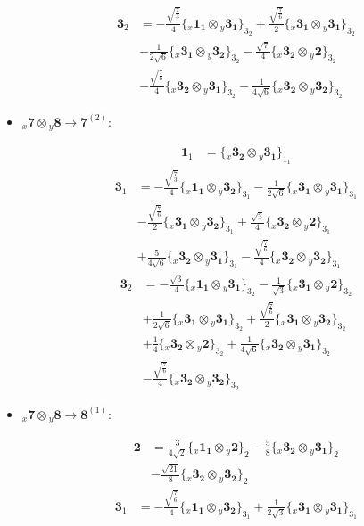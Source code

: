 \documentclass[english]{article}
\newcommand{\rep}[1]{\mathbf{#1}}
\newcommand{\repx}[2]{{}_{#2}\mathbf{#1}}
\newcommand{\tsprodx}[2]{\repx{#1}{x}\otimes\repx{#2}{y}}
\newcommand{\subcgs}[3]{\big\{ \tsprodx{#1}{#2}\big\}^{}_{#3}}
\begin{document}
\begin{itemize}
\begin{fleqn}
\begin{align*}
\rep{3}_{2} & = -\frac{\sqrt{\frac{7}{3}}}{4}\subcgs{1_{1}}{3_{1}}{3_{2}}+\frac{\sqrt{\frac{7}{6}}}{2}\subcgs{3_{1}}{3_{1}}{3_{2}} \\ 
 & -\frac{1}{2 \sqrt{6}}\subcgs{3_{1}}{3_{2}}{3_{2}}-\frac{\sqrt{7}}{4}\subcgs{3_{2}}{2}{3_{2}} \\ 
 & -\frac{\sqrt{\frac{7}{6}}}{4}\subcgs{3_{2}}{3_{1}}{3_{2}}-\frac{1}{4 \sqrt{6}}\subcgs{3_{2}}{3_{2}}{3_{2}}
\end{align*}
\end{fleqn}
\item $\tsprodx{7}{8}\to\rep{7}^{(2)}$:
\begin{fleqn}
\begin{align*}
\rep{1}_{1} & = \subcgs{3_{2}}{3_{1}}{1_{1}}
\end{align*}
\begin{align*}
\rep{3}_{1} & = -\frac{\sqrt{\frac{7}{3}}}{4}\subcgs{1_{1}}{3_{2}}{3_{1}}-\frac{1}{2 \sqrt{6}}\subcgs{3_{1}}{3_{1}}{3_{1}} \\ 
 & -\frac{\sqrt{\frac{7}{6}}}{2}\subcgs{3_{1}}{3_{2}}{3_{1}}+\frac{\sqrt{3}}{4}\subcgs{3_{2}}{2}{3_{1}} \\ 
 & +\frac{5}{4 \sqrt{6}}\subcgs{3_{2}}{3_{1}}{3_{1}}-\frac{\sqrt{\frac{7}{6}}}{4}\subcgs{3_{2}}{3_{2}}{3_{1}}
\end{align*}
\begin{align*}
\rep{3}_{2} & = -\frac{\sqrt{3}}{4}\subcgs{1_{1}}{3_{1}}{3_{2}}-\frac{1}{\sqrt{3}}\subcgs{3_{1}}{2}{3_{2}} \\ 
 & +\frac{1}{2 \sqrt{6}}\subcgs{3_{1}}{3_{1}}{3_{2}}+\frac{\sqrt{\frac{7}{6}}}{2}\subcgs{3_{1}}{3_{2}}{3_{2}} \\ 
 & +\frac{1}{4}\subcgs{3_{2}}{2}{3_{2}}+\frac{1}{4 \sqrt{6}}\subcgs{3_{2}}{3_{1}}{3_{2}} \\ 
 & -\frac{\sqrt{\frac{7}{6}}}{4}\subcgs{3_{2}}{3_{2}}{3_{2}}
\end{align*}
\end{fleqn}
\item $\tsprodx{7}{8}\to\rep{8}^{(1)}$:
\begin{fleqn}
\begin{align*}
\rep{2} & = \frac{3}{4 \sqrt{2}}\subcgs{1_{1}}{2}{2}-\frac{5}{8}\subcgs{3_{2}}{3_{1}}{2} \\ 
 & -\frac{\sqrt{21}}{8}\subcgs{3_{2}}{3_{2}}{2}
\end{align*}
\begin{align*}
\rep{3}_{1} & = -\frac{\sqrt{\frac{7}{6}}}{4}\subcgs{1_{1}}{3_{2}}{3_{1}}+\frac{1}{2 \sqrt{3}}\subcgs{3_{1}}{3_{1}}{3_{1}} \\ 

\end{align*}
\end{fleqn}
\end{itemize}
\end{document}
